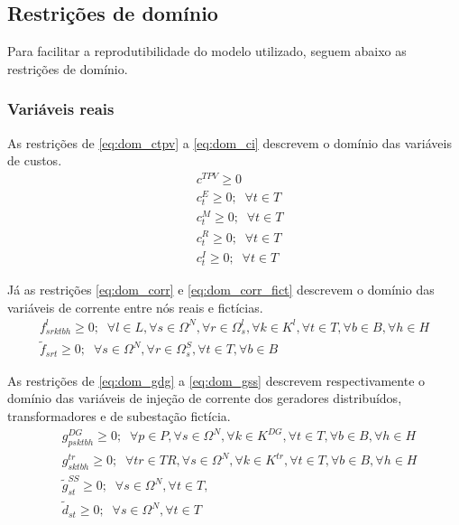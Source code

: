\subsection{Restrições de domínio}


Para facilitar a reprodutibilidade do modelo utilizado, seguem abaixo as restrições de domínio.

\subsubsection*{Variáveis reais}

As restrições de \eqref{eq:dom_ctpv} a \eqref{eq:dom_ci} descrevem o domínio das variáveis de custos.
\begin{align}
    &c^{TPV} \geq 0 \label{eq:dom_ctpv}\\
    &c^E_t \geq 0; \; \;\forall t \in T \\
    &c^M_t \geq 0; \; \;\forall t \in T \\
    &c^R_t \geq 0; \; \;\forall t \in T \\
    &c^I_t \geq 0; \; \;\forall t \in T \label{eq:dom_ci}
\end{align}

Já as restrições \eqref{eq:dom_corr} e \eqref{eq:dom_corr_fict} descrevem o domínio das variáveis de corrente entre nós reais e fictícias.
\begin{align}
f^l_{srktbh} \geq 0; \; \;\forall l \in L, \forall s \in \Omega^N, \forall r \in \Omega^l_s, \forall k \in K^l, \forall t \in T, \forall b \in B , \forall h \in H \label{eq:dom_corr}\\
\widetilde{f}_{srt} \geq 0; \; \;\forall s \in \Omega^N, \forall r \in \Omega^S_s, \forall t \in T, \forall b \in B
\label{eq:dom_corr_fict}
\end{align}

As restrições de \eqref{eq:dom_gdg} a \eqref{eq:dom_gss} descrevem respectivamente o domínio das variáveis de injeção de corrente dos geradores distribuídos, transformadores e de subestação fictícia.
\begin{align}
&g^{DG}_{psktbh} \geq 0; \; \; \forall p \in P, \forall s \in \Omega^N, \forall k \in K^{DG}, \forall t \in T, \forall b \in B , \forall h \in H \label{eq:dom_gdg}\\
&g^{tr}_{sktbh} \geq 0; \; \; \forall tr \in TR, \forall s \in \Omega^N, \forall k \in K^{tr}, \forall t \in T, \forall b \in B , \forall h \in H \\
&\widetilde{g}^{SS}_{st} \geq 0; \; \; \forall s \in \Omega^N, \forall t \in T, \label{eq:dom_gss}\\
&\widetilde{d}_{st} \geq 0; \; \; \forall s \in \Omega^N, \forall t \in T 
\end{align}

